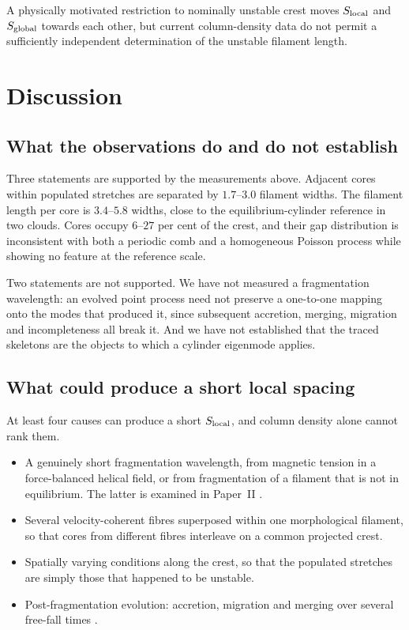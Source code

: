 \documentclass[usenatbib,twoside,twocolumn]{mnras}
\begin{document}
A physically motivated restriction to nominally unstable crest moves $S_{\rm local}$ and $S_{\rm global}$ towards each other, but current column-density data do not permit a sufficiently independent determination of the unstable filament length.




\section{Discussion}
\label{sec:discussion}

\subsection{What the observations do and do not establish}

Three statements are supported by the measurements above. Adjacent cores within populated stretches are separated by $1.7$--$3.0$ filament widths. The filament length per core is $3.4$--$5.8$ widths, close to the equilibrium-cylinder reference in two clouds. Cores occupy $6$--$27$ per cent of the crest, and their gap distribution is inconsistent with both a periodic comb and a homogeneous Poisson process while showing no feature at the reference scale.

Two statements are not supported. We have not measured a fragmentation wavelength: an evolved point process need not preserve a one-to-one mapping onto the modes that produced it, since subsequent accretion, merging, migration and incompleteness all break it. And we have not established that the traced skeletons are the objects to which a cylinder eigenmode applies.

\subsection{What could produce a short local spacing}

At least four causes can produce a short $S_{\rm local}$, and column density alone cannot rank them.

\begin{itemize}\setlength{\itemsep}{1pt}
\item A genuinely short fragmentation wavelength, from magnetic tension in a force-balanced helical field, or from fragmentation of a filament that is not in equilibrium. The latter is examined in Paper~II \citep{PaperII}.
\item Several velocity-coherent fibres superposed within one morphological filament, so that cores from different fibres interleave on a common projected crest.
\item Spatially varying conditions along the crest, so that the populated stretches are simply those that happened to be unstable.
\item Post-fragmentation evolution: accretion, migration and merging over several free-fall times \citep{Kirk2016,Mattern2018,Clarke2020}.
\end{itemize}
\end{document}
